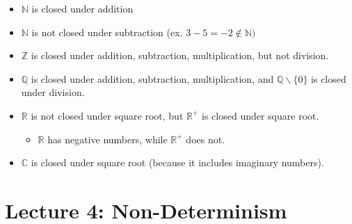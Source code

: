 \documentclass[11pt,a4paper]{article}
\begin{document}
\begin{itemize}
    \item $\mathbb{N}$ is closed under addition
    \item $\mathbb{N}$ is not closed under subtraction (ex. $3-5=-2\notin\mathbb{N})$
    \item $\mathbb{Z}$ is closed under addition, subtraction, multiplication, but not division.
    \item $\mathbb{Q}$ is closed under addition, subtraction, multiplication, and $\mathbb{Q} \backslash \{0\}$ is closed under division.
    \item $\mathbb{R}$ is not closed under square root, but $\mathbb{R^+}$ is closed under square root.
    \begin{itemize}
        \item $\mathbb{R}$ has negative numbers, while $\mathbb{R^+}$ does not.
    \end{itemize}
    \item $\mathbb{C}$ is closed under square root (because it includes imaginary numbers).
\end{itemize}





\section{Lecture 4: Non-Determinism}
\end{document}
